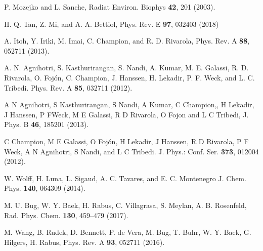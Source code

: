 \documentclass[10pt,showpacs,showkeys,twocolumn]{revtex4}
\begin{document}
\begin{thebibliography}{}
P. Mozejko and L. Sanche, 
Radiat Environ. Biophys \textbf{42}, 201 (2003).

H. Q. Tan, Z. Mi, and A. A. Bettiol, 
Phys. Rev. E \textbf{97}, 032403 (2018)

A. Itoh, Y. Iriki, M. Imai, C. Champion, and R. D. Rivarola, 
Phys. Rev. A \textbf{88}, 052711 (2013).

A. N. Agnihotri, S. Kasthurirangan, S. Nandi, A.
Kumar, M. E. Galassi, R. D. Rivarola, O. Foj\'{o}n, C. Champion, J. Hanssen,
H. Lekadir, P. F. Weck, and L. C. Tribedi. 
Phys. Rev. A \textbf{85}, 032711 (2012).

A N Agnihotri, S Kasthurirangan, S Nandi, A Kumar, C Champion,, H Lekadir, 
J Hanssen, P FWeck, M E Galassi, R D Rivarola, O Fojon and L C Tribedi, 
J. Phys. B \textbf{46}, 185201 (2013).

C Champion, M E Galassi, O Foj\'{o}n, H Lekadir, J Hanssen, R D Rivarola,
P F Weck, A N Agnihotri, S Nandi, and L C Tribedi. 
J. Phys.: Conf. Ser. \textbf{373}, 012004 (2012).

W. Wolff, H. Luna, L. Sigaud, A. C. Tavares, and E. C. Montenegro
J. Chem. Phys. \textbf{140}, 064309 (2014).

M. U. Bug, W. Y. Baek, H. Rabus, C. Villagrasa, S. Meylan, A. B. Rosenfeld,
Rad. Phys. Chem. \textbf{130}, 459--479 (2017).

M. Wang, B. Rudek, D. Bennett, P. de Vera, M. Bug, T. Buhr, W. Y. Baek, 
G. Hilgers, H. Rabus, 
Phys. Rev. A \textbf{93}, 052711 (2016).


\end{thebibliography}
\end{document}
